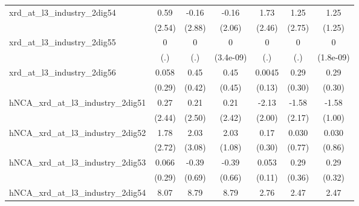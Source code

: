 {\begin{tabular}{l*{6}{c}}
\addlinespace
xrd\_at\_l3\_industry\_2dig54&        0.59         &       -0.16         &       -0.16         &        1.73         &        1.25         &        1.25         \\
                    &      (2.54)         &      (2.88)         &      (2.06)         &      (2.46)         &      (2.75)         &      (1.25)         \\
\addlinespace
xrd\_at\_l3\_industry\_2dig55&           0         &           0         &           0         &           0         &           0         &           0         \\
                    &         (.)         &         (.)         &   (3.4e-09)         &         (.)         &         (.)         &   (1.8e-09)         \\
\addlinespace
xrd\_at\_l3\_industry\_2dig56&       0.058         &        0.45         &        0.45         &      0.0045         &        0.29         &        0.29         \\
                    &      (0.29)         &      (0.42)         &      (0.45)         &      (0.13)         &      (0.30)         &      (0.30)         \\
\addlinespace
hNCA\_xrd\_at\_l3\_industry\_2dig51&        0.27         &        0.21         &        0.21         &       -2.13         &       -1.58         &       -1.58         \\
                    &      (2.44)         &      (2.50)         &      (2.42)         &      (2.00)         &      (2.17)         &      (1.00)         \\
\addlinespace
hNCA\_xrd\_at\_l3\_industry\_2dig52&        1.78         &        2.03         &        2.03\sym{*}  &        0.17         &       0.030         &       0.030         \\
                    &      (2.72)         &      (3.08)         &      (1.08)         &      (0.30)         &      (0.77)         &      (0.86)         \\
\addlinespace
hNCA\_xrd\_at\_l3\_industry\_2dig53&       0.066         &       -0.39         &       -0.39         &       0.053         &        0.29         &        0.29         \\
                    &      (0.29)         &      (0.69)         &      (0.66)         &      (0.11)         &      (0.36)         &      (0.32)         \\
\addlinespace
hNCA\_xrd\_at\_l3\_industry\_2dig54&        8.07         &        8.79         &        8.79\sym{***}&        2.76         &        2.47         &        2.47\sym{*}  \\

\end{tabular}}

